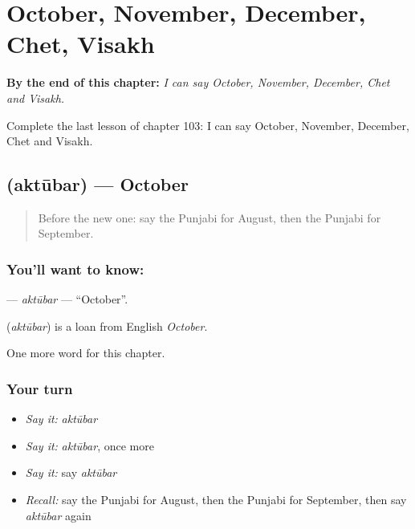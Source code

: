 
\chapter{October, November, December, Chet, Visakh}
\label{ch:pa-october-november-december-chet-visakh}

\begin{chapteropening}
\textbf{By the end of this chapter:} \emph{I can say October, November, December, Chet and Visakh.}

Complete the last lesson of chapter 103: I can say October, November, December, Chet and Visakh.
\end{chapteropening}

\section[\texorpdfstring{\pa{ਅਕਤੂਬਰ} (aktūbar)}{ਅਕਤੂਬਰ (aktūbar)}]{ (aktūbar) — October}

\label{lesson:PA-C103-aktubar}



\begin{quote}
Before the new one: say the Punjabi for August, then the Punjabi for September.
\end{quote}

\subsection*{You'll want to know: }
\textbf{} — \emph{aktūbar} — \textquotedblleft{}October\textquotedblright{}.

\begin{cousinweb}
\textbf{} (\emph{aktūbar}) is a loan from English \emph{October}.
\end{cousinweb}

\begin{grammarlens}[title={What you've built}]
One more word for this chapter.
\end{grammarlens}

\subsection*{Your turn}
\begin{itemize}
\raggedright
  \item \emph{Say it:} \emph{aktūbar}
  \item \emph{Say it:} \emph{aktūbar}, once more
  \item \emph{Say it:} say \emph{aktūbar}
  \item \emph{Recall:} say the Punjabi for August, then the Punjabi for September, then say \emph{aktūbar} again
\end{itemize}

